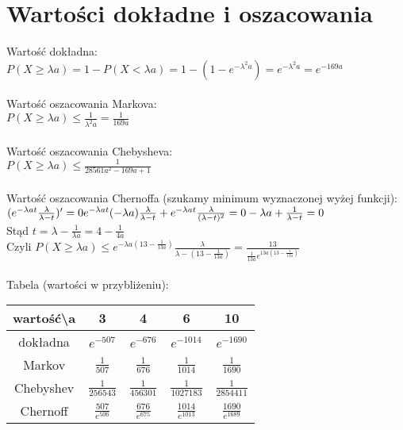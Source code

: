 \documentclass{article}
\begin{document}
\section{Wartości dokładne i oszacowania}
\Large
Wartość dokładna: \\
$P(X \geqslant\lambda a) = 1 - P(X < \lambda a) = 1 - (1 - e^{-{\lambda^2} a}) = e^{-{\lambda^2} a} = e^{-169 a}$ \\ \\
Wartość oszacowania Markova: \\
$P(X \geqslant\lambda a ) \leqslant \frac 1 {\lambda^2 a} = \frac 1 {169 a}$ \\ \\
Wartość oszacowania Chebysheva: \\
$P(X \geqslant\lambda a ) \leqslant \frac 1 {28561 a^2 - 169 a + 1}$ \\ \\
Wartość oszacowania Chernoffa (szukamy minimum wyznaczonej wyżej funkcji): \\
$(e^{- \lambda a t} \frac \lambda {\lambda -t})' = 0 \\
e^{- \lambda a t} (- \lambda a) \frac \lambda {\lambda - t} + e^{- \lambda a t} \frac \lambda {({\lambda - t})^2} = 0 \\
- \lambda a + \frac 1 {\lambda - t} = 0$ \\
Stąd $t = \lambda - \frac 1 {\lambda a} = 4 - \frac 1 {4 a}$ \\
Czyli $P(X \geqslant\lambda a ) \leqslant e^{- \lambda a ({13 - \frac 1 {13 a}})} \frac \lambda {\lambda - (13 - \frac 1 {13 a})} = \frac {13} {\frac 1 {13 a} e^{13 a (13 - {\frac 1 {13 a}})}}$ \\ \\
Tabela (wartości w przybliżeniu): \\
\begin{center}
\begin{tabular}{ |c|c|c|c|c|}
 \hline 
 wartość\textbackslash a & 3 & 4 & 6 & 10 \\
 \hline\hline
 dokładna & $e^{-507}$ & $e^{-676}$ & $e^{-1014}$ & $e^{-1690}$\\
 \hline
 Markov & $ \frac{1}{507}$ & $ \frac{1}{676}$ & $ \frac{1}{1014}$ & $ \frac{1}{1690}$\\
 \hline
 Chebyshev & $ \frac{1}{256543}$ & $ \frac{1}{456301}$ & $ \frac{1}{1027183}$ & $ \frac{1}{2854411}$\\
 \hline
 Chernoff & $ \frac {507}{e^{506}}$ & $ \frac{676}{e^{675}}$ & $ \frac {1014} {e^{1013}}$ & $ \frac{1690}{e^{1689}}$\\
 \hline
\end{tabular}
\end{center}
\end{document}
